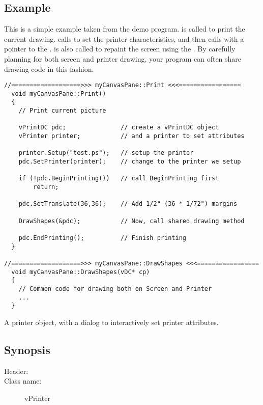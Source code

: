\subsection* {Example}

This is a simple example taken from the  demo program.
 is called to print the current drawing. 
calls  to set the printer characteristics,
and then calls  with a pointer to the .
 is also called to repaint the screen using the
. By carefully planning for both screen and
printer drawing, your program can often share drawing code in
this fashion.

\footnotesize
\begin{verbatim}
//===================>>> myCanvasPane::Print <<<=================
  void myCanvasPane::Print()
  {
    // Print current picture

    vPrintDC pdc;               // create a vPrintDC object
    vPrinter printer;           // and a printer to set attributes

    printer.Setup("test.ps");   // setup the printer
    pdc.SetPrinter(printer);    // change to the printer we setup

    if (!pdc.BeginPrinting())   // call BeginPrinting first
        return;

    pdc.SetTranslate(36,36);    // Add 1/2" (36 * 1/72") margins

    DrawShapes(&pdc);           // Now, call shared drawing method

    pdc.EndPrinting();          // Finish printing
  }

//===================>>> myCanvasPane::DrawShapes <<<=================
  void myCanvasPane::DrawShapes(vDC* cp)
  {
    // Common code for drawing both on Screen and Printer
    ...
  }
\end{verbatim}
\normalfont\normalsize


A printer object, with a dialog to interactively set printer
attributes.

\subsection* {Synopsis}

\begin{description}
	\item [Header:] 
	\item [Class name:] vPrinter
\end{description}

